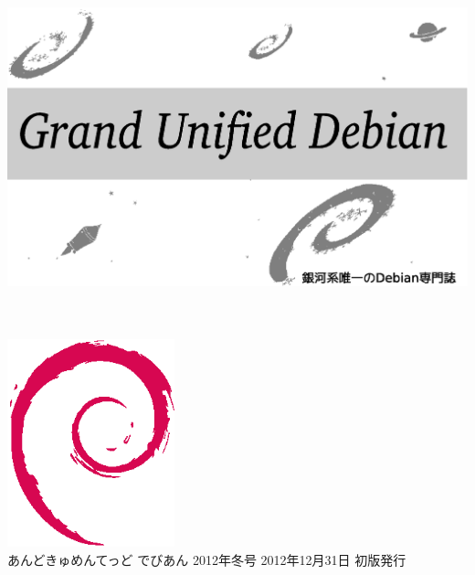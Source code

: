 \documentclass[mingoth,a4paper]{jsarticle}
\begin{document}
\begin{titlepage}
\thispagestyle{empty}

\hspace*{-2.5cm}
\includegraphics{image2012-natsu/gudeb.eps}\\
\\
\\

\hspace*{11cm}\includegraphics[height=6cm]{image200502/openlogo-nd.eps}\\
\vspace*{0.1cm}
\hfill あんどきゅめんてっど でびあん 2012年冬号 2012年12月31日 初版発行
\end{titlepage}

\newpage
\thispagestyle{empty}\mbox{}
\newpage
\end{document}

